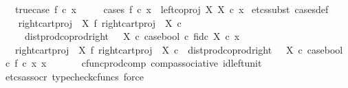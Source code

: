 \begin{isabellebody}
\ \ \ true{\isacharunderscore}{\kern0pt}case{\isacharcolon}{\kern0pt}\ {\isachardoublequoteopen}f\ {\isasymcirc}\isactrlsub c\ x\ {\isacharequal}{\kern0pt}\ {\isasymt}{\isachardoublequoteclose}\isanewline
\ \ \ {\isachardoublequoteopen}cases\ f\ {\isasymcirc}\isactrlsub c\ x\ {\isacharequal}{\kern0pt}\ left{\isacharunderscore}{\kern0pt}coproj\ X\ X\ {\isasymcirc}\isactrlsub c\ x{\isachardoublequoteclose}\isanewline
%
\isadelimproof
%
\endisadelimproof
%
\isatagproof
{}\isamarkupfalse%
\ {\isacharparenleft}{\kern0pt}etcs{\isacharunderscore}{\kern0pt}subst\ cases{\isacharunderscore}{\kern0pt}def{}{\isacharparenright}{\kern0pt}\ \ \isanewline
\ \ \isamarkupfalse%
\ {\isachardoublequoteopen}{\isacharparenleft}{\kern0pt}{\isacharparenleft}{\kern0pt}right{\isacharunderscore}{\kern0pt}cart{\isacharunderscore}{\kern0pt}proj\ {\isasymone}\ X\ {\isasymbowtie}\isactrlsub f\ right{\isacharunderscore}{\kern0pt}cart{\isacharunderscore}{\kern0pt}proj\ {\isasymone}\ X{\isacharparenright}{\kern0pt}\ {\isasymcirc}\isactrlsub c\isanewline
\ \ \ \ \ dist{\isacharunderscore}{\kern0pt}prod{\isacharunderscore}{\kern0pt}coprod{\isacharunderscore}{\kern0pt}right\ {\isasymone}\ {\isasymone}\ X\ {\isasymcirc}\isactrlsub c\ {\isasymlangle}case{\isacharunderscore}{\kern0pt}bool\ {\isasymcirc}\isactrlsub c\ f{\isacharcomma}{\kern0pt}id\isactrlsub c\ X{\isasymrangle}{\isacharparenright}{\kern0pt}\ {\isasymcirc}\isactrlsub c\ x\ \isanewline
\ \ {\isacharequal}{\kern0pt}\ {\isacharparenleft}{\kern0pt}right{\isacharunderscore}{\kern0pt}cart{\isacharunderscore}{\kern0pt}proj\ {\isasymone}\ X\ {\isasymbowtie}\isactrlsub f\ right{\isacharunderscore}{\kern0pt}cart{\isacharunderscore}{\kern0pt}proj\ {\isasymone}\ X{\isacharparenright}{\kern0pt}\ {\isasymcirc}\isactrlsub c\ \ dist{\isacharunderscore}{\kern0pt}prod{\isacharunderscore}{\kern0pt}coprod{\isacharunderscore}{\kern0pt}right\ {\isasymone}\ {\isasymone}\ X\ {\isasymcirc}\isactrlsub c\ {\isasymlangle}case{\isacharunderscore}{\kern0pt}bool\ {\isasymcirc}\isactrlsub c\ f\ {\isasymcirc}\isactrlsub c\ x{\isacharcomma}{\kern0pt}\ x{\isasymrangle}{\isachardoublequoteclose}\isanewline
\ \ \ \ \ \isamarkupfalse%
\ cfunc{\isacharunderscore}{\kern0pt}prod{\isacharunderscore}{\kern0pt}comp\ comp{\isacharunderscore}{\kern0pt}associative{}\ id{\isacharunderscore}{\kern0pt}left{\isacharunderscore}{\kern0pt}unit{}\ \ \isamarkupfalse%
\ {\isacharparenleft}{\kern0pt}etcs{\isacharunderscore}{\kern0pt}assocr{\isacharcomma}{\kern0pt}\ typecheck{\isacharunderscore}{\kern0pt}cfuncs{\isacharcomma}{\kern0pt}\ force{\isacharparenright}{\kern0pt}\isanewline

\end{isabellebody}

